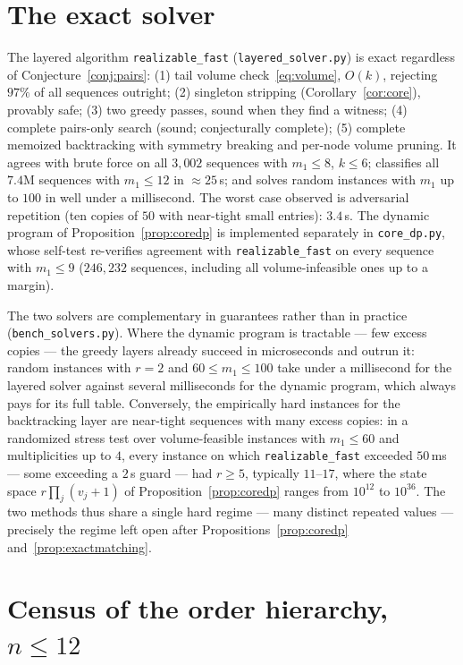 \documentclass[11pt]{article}
\theoremstyle{definition}
\theoremstyle{remark}
\begin{document}
\appendix

\section{The exact solver}\label{app:solver}

The layered algorithm \texttt{realizable\_fast} (\texttt{layered\_solver.py}) is exact
regardless of Conjecture~\ref{conj:pairs}: (1) tail volume check~\eqref{eq:volume},
$O(k)$, rejecting $97\%$ of all sequences outright; (2) singleton stripping
(Corollary~\ref{cor:core}), provably safe; (3) two greedy passes, sound when they
find a witness; (4) complete pairs-only search (sound; conjecturally complete);
(5) complete memoized backtracking with symmetry breaking and per-node volume
pruning. It agrees with brute force on all $3{,}002$ sequences with $m_1\le8$,
$k\le6$; classifies all $7.4$M sequences with $m_1\le12$ in ${\approx}25$\,s; and
solves random instances with $m_1$ up to $100$ in well under a millisecond. The
worst case observed is adversarial repetition (ten copies of $50$ with near-tight
small entries): $3.4$\,s. The dynamic program of Proposition~\ref{prop:coredp} is
implemented separately in \texttt{core\_dp.py}, whose self-test re-verifies
agreement with \texttt{realizable\_fast} on every sequence with $m_1\le9$
($246{,}232$ sequences, including all volume-infeasible ones up to a margin).

The two solvers are complementary in guarantees rather than in practice
(\texttt{bench\_solvers.py}). Where the dynamic program is tractable --- few
excess copies --- the greedy layers already succeed in microseconds and outrun
it: random instances with $r=2$ and $60\le m_1\le100$ take under a millisecond
for the layered solver against several milliseconds for the dynamic program,
which always pays for its full table. Conversely, the empirically hard
instances for the backtracking layer are near-tight sequences with many excess
copies: in a randomized stress test over volume-feasible instances with
$m_1\le60$ and multiplicities up to $4$, every instance on which
\texttt{realizable\_fast} exceeded $50$\,ms --- some exceeding a $2$\,s guard ---
had $r\ge5$, typically $11$--$17$, where the state space $r\prod_j(v_j+1)$ of
Proposition~\ref{prop:coredp} ranges from $10^{12}$ to $10^{36}$. The two
methods thus share a single hard regime --- many distinct repeated values ---
precisely the regime left open after Propositions~\ref{prop:coredp}
and~\ref{prop:exactmatching}.

\section{Census of the order hierarchy, $n\le12$}\label{app:census}
\end{document}
